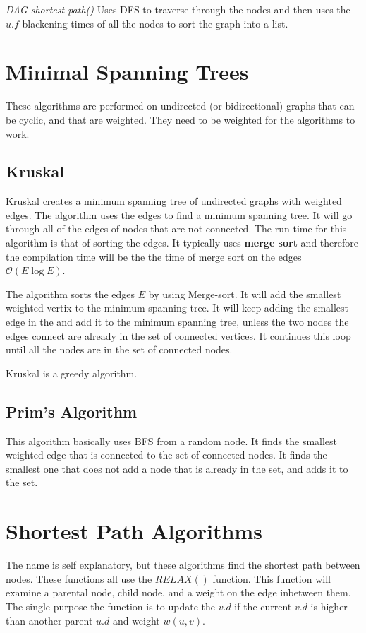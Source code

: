\emph{DAG-shortest-path()} Uses DFS to traverse through the nodes and then uses the $u.f$ blackening times of all the nodes to sort the graph into a list. 

\section{Minimal Spanning Trees}

These algorithms are performed on undirected (or bidirectional) graphs that can be cyclic, and that are weighted. They need to be weighted for the algorithms to work.

\subsection{Kruskal}

Kruskal creates a minimum spanning tree of undirected graphs with weighted edges.
The algorithm uses the edges to find a minimum spanning tree. It will go through all of the edges of nodes that are not connected. The run time for this algorithm is that of sorting the edges. It typically uses \textbf{merge sort} and therefore the compilation time will be the the time of merge sort on the edges $\mathcal{O}(E\log{E})$. 

The algorithm sorts the edges $E$ by using Merge-sort. It will add the smallest weighted vertix to the minimum spanning tree. It will keep adding the smallest edge in the and add it to the minimum spanning tree, unless the two nodes the edges connect are already in the set of connected vertices. It continues this loop until all the nodes are in the set of connected nodes. 

Kruskal is a greedy algorithm.

\subsection{Prim's Algorithm}

This algorithm basically uses BFS from a random node. It finds the smallest weighted edge that is connected to the set of connected nodes. It finds the smallest one that does not add a node that is already in the set, and adds it to the set.

\section{Shortest Path Algorithms}

The name is self explanatory, but these algorithms find the shortest path between nodes. These functions all use the $RELAX()$ function. This function will examine a parental node, child node, and a weight on the edge inbetween them. The single purpose the function is to update the $v.d$ if the current $v.d$ is higher than another parent $u.d$ and weight $w(u, v)$. 

